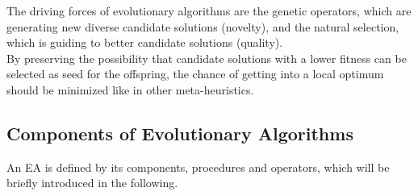 The driving forces of evolutionary algorithms are the genetic operators, which are generating new diverse candidate solutions (novelty), and the natural selection, which is guiding to better candidate solutions (quality)\cite{Eiben}.\\
By preserving the possibility that candidate solutions with a lower fitness can be selected as seed for the offspring, the chance of getting into a local optimum should be minimized like in other meta-heuristics.\\

    \subsection{Components of Evolutionary Algorithms}
    An EA is defined by its components, procedures and operators, which will be briefly introduced in the following.

